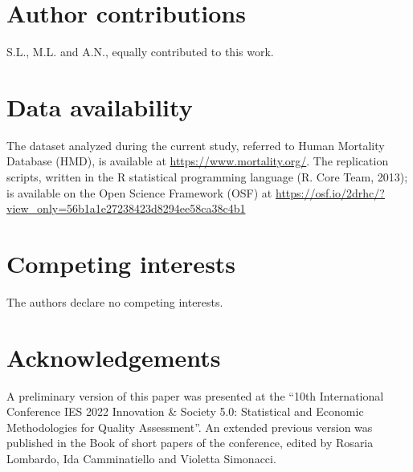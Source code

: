 \documentclass[fleqn,10pt]{wlscirep}
\begin{document}


 


\section*{Author contributions}
S.L., M.L. and A.N., equally contributed to this work.

\section*{Data availability}
The dataset analyzed during the current study, referred to Human Mortality Database (HMD), is available at \url{https://www.mortality.org/}.
The replication scripts, written in the R statistical programming
language (R. Core Team, 2013); \linebreak is available on the Open Science Framework (OSF) at 
\linebreak \url{https://osf.io/2drhc/?view_only=56b1a1e27238423d8294ee58ca38c4b1}


\section*{Competing interests}
The authors declare no competing interests.

\section*{Acknowledgements}
A preliminary version of this paper was presented at the “10th International Conference IES 2022 Innovation \& Society 5.0: Statistical and Economic Methodologies for Quality Assessment”. An extended previous version was published in the Book of short papers of the conference, edited by Rosaria Lombardo, Ida Camminatiello and Violetta Simonacci.
\end{document}
